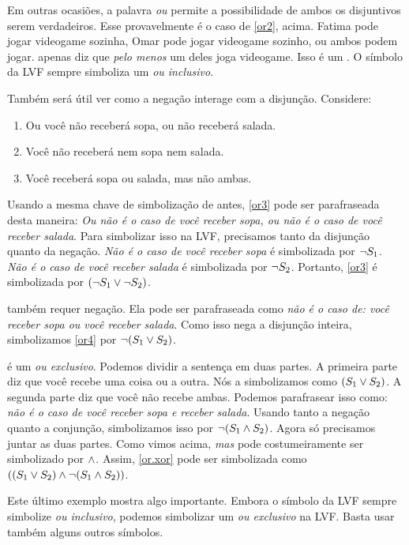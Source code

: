 Em outras ocasiões, a palavra \emph{ou} permite a possibilidade de ambos
os disjuntivos serem verdadeiros. Esse provavelmente é o caso de
\cref{or2}, acima. Fatima pode jogar videogame sozinha, Omar pode jogar
videogame sozinho, ou ambos podem jogar.  apenas diz que
\emph{pelo menos} um deles joga videogame. Isso é um . O símbolo \eor da LVF sempre simboliza um \emph{ou inclusivo}.

Também será útil ver como a negação interage com a disjunção. Considere:
	\begin{enumerate}
		\item\label{or3}Ou você não receberá sopa, ou não receberá salada.
		\item\label{or4}Você não receberá nem sopa nem salada.
		\item\label{or.xor}Você receberá sopa ou salada, mas não ambas.
	\end{enumerate}
Usando a mesma chave de simbolização de antes, \cref*{or3} pode ser
parafraseada desta maneira: \emph{Ou não é o caso de você receber sopa,
ou não é o caso de você receber salada}. Para simbolizar isso na LVF,
precisamos tanto da disjunção quanto da negação. \emph{Não é o caso de
você receber sopa} é simbolizada por $\neg S_1$. \emph{Não é o caso de
você receber salada} é simbolizada por $\neg S_2$. Portanto,
\cref*{or3} é simbolizada por $(\neg S_1 \vee \neg S_2)$.

 também requer negação. Ela pode ser parafraseada como
\emph{não é o caso de: você receber sopa ou você receber salada}. Como
isso nega a disjunção inteira, simbolizamos \cref*{or4} por
$\neg (S_1 \vee S_2)$.

 é um \emph{ou exclusivo}. Podemos dividir a sentença em
duas partes. A primeira parte diz que você recebe uma coisa ou a outra.
Nós a simbolizamos como $(S_1 \vee S_2)$. A segunda parte diz que você
não recebe ambas. Podemos parafrasear isso como: \emph{não é o caso de
você receber sopa e receber salada}. Usando tanto a negação quanto a
conjunção, simbolizamos isso por $\neg(S_1 \wedge S_2)$. Agora só
precisamos juntar as duas partes. Como vimos acima, \emph{mas} pode
costumeiramente ser simbolizado por $\wedge$. Assim, \cref*{or.xor} pode
ser simbolizada como $((S_1 \vee S_2) \wedge \neg(S_1 \wedge S_2))$.

Este último exemplo mostra algo importante. Embora o símbolo \eor da LVF
sempre simbolize \emph{ou inclusivo}, podemos simbolizar um \emph{ou
exclusivo} na LVF. Basta usar também alguns outros símbolos.


